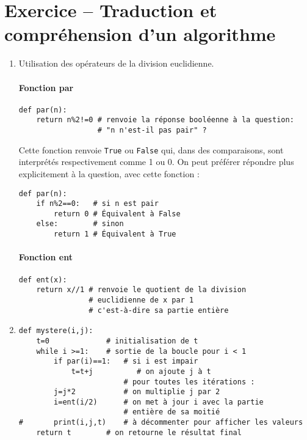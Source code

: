 \setcounter{section}{0}
\section{Exercice -- Traduction et compréhension d'un algorithme}


\begin{enumerate}
\item Utilisation des opérateurs de la division euclidienne.

\paragraph{Fonction par}
\begin{verbatim}
def par(n):
    return n%2!=0 # renvoie la réponse booléenne à la question:
                  # "n n'est-il pas pair" ?
\end{verbatim}

Cette fonction renvoie \texttt{True} ou \texttt{False} qui, dans des comparaisons, sont interprétés respectivement comme 1 ou 0. On peut préférer répondre plus explicitement à la question, avec cette fonction : 

\begin{verbatim}
def par(n):
    if n%2==0:   # si n est pair
        return 0 # Équivalent à False
    else:        # sinon
        return 1 # Équivalent à True
\end{verbatim}

\paragraph{Fonction ent}
    
\begin{verbatim}
def ent(x):
    return x//1 # renvoie le quotient de la division 
                # euclidienne de x par 1
                # c'est-à-dire sa partie entière
\end{verbatim}

\item 
\begin{verbatim}
def mystere(i,j):
    t=0             # initialisation de t
    while i >=1:    # sortie de la boucle pour i < 1
        if par(i)==1:   # si i est impair
            t=t+j          # on ajoute j à t
                        # pour toutes les itérations :
        j=j*2           # on multiplie j par 2
        i=ent(i/2)      # on met à jour i avec la partie 
                        # entière de sa moitié
#       print(i,j,t)    # à décommenter pour afficher les valeurs 
    return t        # on retourne le résultat final


\end{verbatim}
\end{enumerate}
